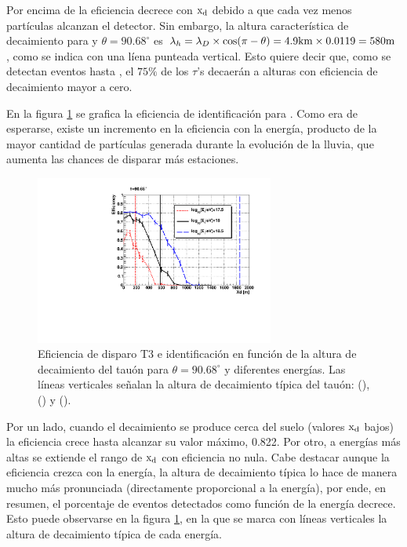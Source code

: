 	Por encima de  la eficiencia decrece con ${\rm x_d}$ debido a que cada vez menos partículas alcanzan el detector.
	Sin embargo, la altura característica de decaimiento para  y $\theta=90.68^\circ$ es $\lambda_h = \lambda_D\times\cos(\pi - \theta) = 4.9{\rm km} \times 0.0119 = 580{\rm m}$, como se indica con una líena punteada vertical.
	Esto quiere decir que, como se detectan eventos hasta , el $75\%$ de los $\tau$'s decaerán a alturas con eficiencia de decaimiento mayor a cero.
	
	En la figura \ref{fig:effES_en} se grafica la eficiencia de identificación para .
	Como era de esperarse, existe un incremento en la eficiencia con la energía, producto de la mayor cantidad de partículas generada durante la evolución de la lluvia, que aumenta las chances de disparar más estaciones.
	\begin{figure}[ht!]
		\begin{center}
			\includegraphics[width=0.7\textwidth]{fig/resultadosAuger/eff_multEnergy_forThesis}
			\caption{Eficiencia de disparo T3 e identificación en función de la altura de decaimiento del tauón para $\theta=90.68^\circ$ y diferentes energías. Las líneas verticales señalan la altura de decaimiento típica del tauón: (),  () y  ().}
			\label{fig:effES_en}
		\end{center}
	\end{figure}
	Por un lado, cuando el decaimiento se produce cerca del suelo (valores ${\rm x_d}$ bajos) la eficiencia crece hasta alcanzar su valor máximo, 0.822.
	Por otro, a energías más altas se extiende el rango de ${\rm x_d}$ con eficiencia no nula.
	Cabe destacar aunque la eficiencia crezca con la energía, la altura de decaimiento típica lo hace de manera mucho más pronunciada (directamente proporcional a la energía), por ende, en resumen, el porcentaje de eventos detectados como función de la energía decrece.
	Esto puede observarse en la figura \ref{fig:effES_en}, en la que se marca con l\'ineas verticales la altura de decaimiento típica de cada energía. 
	
